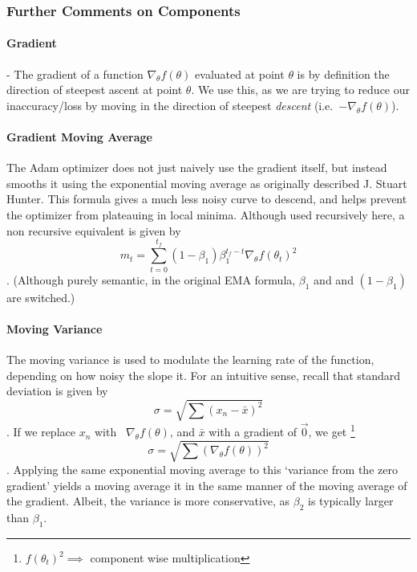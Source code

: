 \documentclass[titlepage,letterpaper]{article}
\begin{document}
\subsubsection{Further Comments on Components}



\paragraph{Gradient} - The gradient of a function $\nabla_\theta f(\theta)$ evaluated at point $\theta$ is by definition the direction of steepest ascent at point $\theta$. We use this, as we are trying to reduce our inaccuracy/loss by moving in the direction of steepest \textit{descent} \mbox{(i.e. $-\nabla_\theta f(\theta)$)}. \cite{gradient} 

\paragraph{Gradient Moving Average}
The Adam optimizer does not just naively use the gradient itself, but instead smooths it using the exponential moving average as originally described J. Stuart Hunter.\cite{EMA} This formula gives a much less noisy curve to descend, and helps prevent the optimizer from plateauing in local minima. Although used recursively here, a non recursive equivalent is given by
\[m_t = \sum_{t=0}^{t_f} \left(1-\beta_1\right) \beta_1^{t_f-t}\nabla_\theta f\left(\theta_{t}\right)^2\].
(Although purely semantic, in the original EMA formula, \(\beta_1\) and and \(\left(1-\beta_1\right)\) are switched.)

\paragraph{Moving Variance}
The moving variance is used to modulate the learning rate of the function, depending on how noisy the slope it. For an intuitive sense, 
recall that standard deviation is given by
\[\sigma = \sqrt{\sum \left(x_n - \bar{x}\right)^2}\].
If we replace \(x_n\) with \ \(\nabla_\theta f(\theta)\), and \(\bar{x}\) with a gradient of \(\vec{0}\), we get \footnote{\(f\left(\theta_{t}\right)^2 \implies \) component wise multiplication}
\[\sigma = \sqrt{\sum \left(\nabla_\theta f(\theta)\right)^2}\].
Applying the same exponential moving average to this `variance from the zero gradient' yields a moving average it in the same manner of the moving average of the gradient. Albeit, the variance is more conservative, as \(\beta_2\) is typically larger than \(\beta_1\)\cite{adam}.
\end{document}
